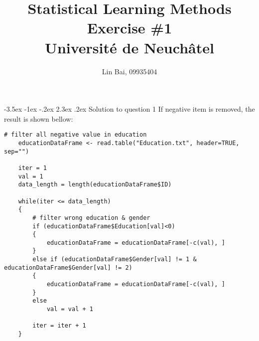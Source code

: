 \documentclass[12pt]{article}
\makeatletter
\renewcommand\section{\@startsection {section}{1}{\z@}%
	{-3.5ex \@plus -1ex \@minus -.2ex}%
	{2.3ex \@plus.2ex}%
	{\normalfont\large\bfseries}}%
\makeatother
\begin{document}
	
	
	
	\title{\textbf{Statistical Learning Methods Exercise \#{1}}\\
	Universit{\'e} de Neuch\^{a}tel}%
	\author{{Lin Bai, 09935404}} %
	
	\maketitle

	\section{Solution to question 1}
	If negative item is removed, the result is shown bellow:
	\lstset{language=R}
	\lstset{frame=lines}
	\lstset{basicstyle=\footnotesize\ttfamily}
	\begin{lstlisting}[breaklines=true]
	# filter all negative value in education
	educationDataFrame <- read.table("Education.txt", header=TRUE, sep="")
	
	iter = 1
	val = 1
	data_length = length(educationDataFrame$ID)
	
	while(iter <= data_length)
	{
		# filter wrong education & gender
		if (educationDataFrame$Education[val]<0)
		{
			educationDataFrame = educationDataFrame[-c(val), ]
		}
		else if (educationDataFrame$Gender[val] != 1 & educationDataFrame$Gender[val] != 2)
		{
			educationDataFrame = educationDataFrame[-c(val), ]
		}
		else
			val = val + 1
	
		iter = iter + 1
	}
	\end{lstlisting}
	
\end{document}
